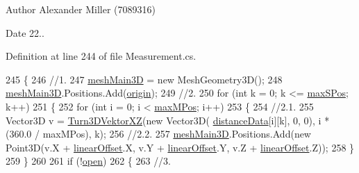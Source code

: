 \begin{DoxyAuthor}{Author}
Alexander Miller (7089316) 
\end{DoxyAuthor}
\begin{DoxyDate}{Date}
22.. 
\end{DoxyDate}


Definition at line 244 of file Measurement.\+cs.


\begin{DoxyCode}
245         \{
246             \textcolor{comment}{//1.}
247             \hyperlink{class_l_i_d_a_r___controller_1_1_measurement_af5ee635f5060386fb2eb131af46b962e}{meshMain3D} = \textcolor{keyword}{new} MeshGeometry3D();
248             \hyperlink{class_l_i_d_a_r___controller_1_1_measurement_af5ee635f5060386fb2eb131af46b962e}{meshMain3D}.Positions.Add(\hyperlink{class_l_i_d_a_r___controller_1_1_measurement_ac0d4306c375f9863f2a1b8591192feca}{origin});
249             \textcolor{comment}{//2.}
250             \textcolor{keywordflow}{for} (\textcolor{keywordtype}{int} k = 0; k <= \hyperlink{class_l_i_d_a_r___controller_1_1_measurement_ad24203fe25dd2b9f232807e2953a2de2}{maxSPos}; k++)
251             \{
252                 \textcolor{keywordflow}{for} (\textcolor{keywordtype}{int} i = 0; i < \hyperlink{class_l_i_d_a_r___controller_1_1_measurement_ae4e112299a3c15095e6148bd06a47946}{maxMPos}; i++)
253                 \{
254                     \textcolor{comment}{//2.1.}
255                     Vector3D v = \hyperlink{class_l_i_d_a_r___controller_1_1_measurement_aff21228516e88970db70287d41ff2e42}{Turn3DVektorXZ}(\textcolor{keyword}{new} Vector3D(
      \hyperlink{class_l_i_d_a_r___controller_1_1_measurement_a5ed2a945e26682eabe612fdcbf6d6c54}{distanceData}[i][k], 0, 0), i * (360.0 / maxMPos), k);
256                     \textcolor{comment}{//2.2.}
257                     \hyperlink{class_l_i_d_a_r___controller_1_1_measurement_af5ee635f5060386fb2eb131af46b962e}{meshMain3D}.Positions.Add(\textcolor{keyword}{new} Point3D(v.X + 
      \hyperlink{class_l_i_d_a_r___controller_1_1_measurement_a00cfc32b350bb7516008ec96ad557f8d}{linearOffset}.X, v.Y + \hyperlink{class_l_i_d_a_r___controller_1_1_measurement_a00cfc32b350bb7516008ec96ad557f8d}{linearOffset}.Y, v.Z + \hyperlink{class_l_i_d_a_r___controller_1_1_measurement_a00cfc32b350bb7516008ec96ad557f8d}{linearOffset}.Z));
258                 \}
259             \}
260 
261             \textcolor{keywordflow}{if} (!\hyperlink{class_l_i_d_a_r___controller_1_1_measurement_ac9a586dd0d097caa2306aa810abd6fcf}{open})
262             \{
263                 \textcolor{comment}{//3.}

\end{DoxyCode}
